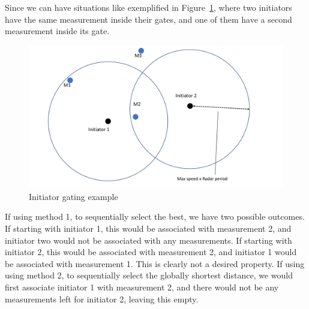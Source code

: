 Since we can have situations like exemplified in Figure~\ref{fig:init_gating}, where two initiators have the same measurement inside their gates, and one of them have a second measurement inside its gate.
\begin{figure}[H]
\centering
\includegraphics[width = .8\textwidth]{Figures/init_gating.pdf}
\caption{Initiator gating example}\label{fig:init_gating}
\end{figure}
If using method 1, to sequentially select the best, we have two possible outcomes. If starting with initiator 1, this would be associated with measurement 2, and initiator two would not be associated with any measurements.  If starting with initiator 2, this would be associated with measurement 2, and initiator 1 would be associated with measurement 1. This is clearly not a desired property. If using using method 2, to sequentially select the globally shortest distance, we would first associate initiator 1 with measurement 2, and there would not be any measurements left for initiator 2, leaving this empty.

